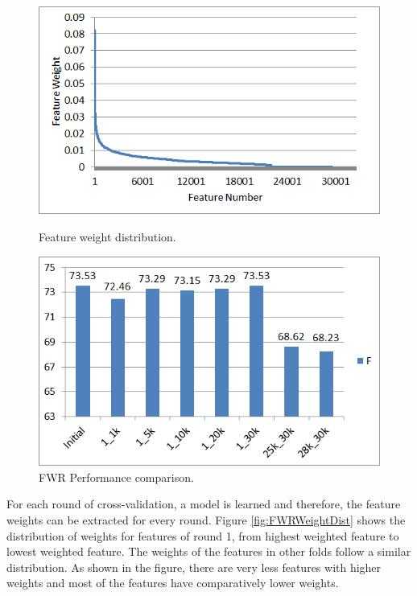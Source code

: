 \begin{figure}
\centering
\begin{minipage}{.5\textwidth}
  \centering
  \includegraphics[width=.95\textwidth]{figures/FWRWeightDist.png}
  \caption{Feature weight distribution.}
  \label{fig:FWRWeightDist}
\end{minipage}%
\begin{minipage}{.5\textwidth}
  \centering
  \includegraphics[width=.95\textwidth]{figures/FWRPerformance.png}
  \caption{FWR Performance comparison.}
  \label{fig:FWRPerfComp}
\end{minipage}
\end{figure}

For each round of cross-validation, a model is learned and therefore, the feature weights can be extracted for every round. Figure \ref{fig:FWRWeightDist} shows the distribution of weights for features of round 1, from highest weighted feature to lowest weighted feature. The weights of the features in other folds follow a similar distribution. As shown in the figure, there are very less features with higher weights and most of the features have comparatively lower weights.

